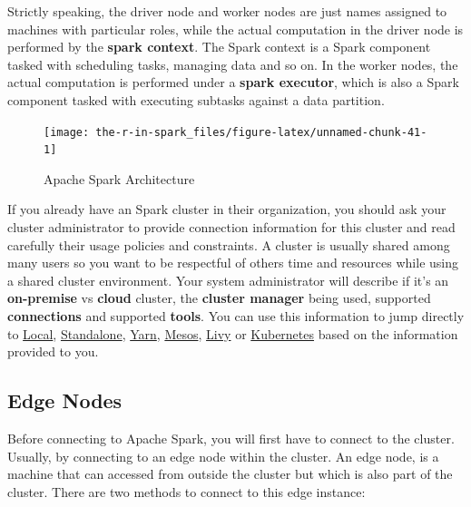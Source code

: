 \documentclass[]{book}
\theoremstyle{definition}
\theoremstyle{definition}
\theoremstyle{definition}
\theoremstyle{remark}
\begin{document}
Strictly speaking, the driver node and worker nodes are just names
assigned to machines with particular roles, while the actual computation
in the driver node is performed by the \textbf{spark context}. The Spark
context is a Spark component tasked with scheduling tasks, managing data
and so on. In the worker nodes, the actual computation is performed
under a \textbf{spark executor}, which is also a Spark component tasked
with executing subtasks against a data partition.

\begin{figure}

{\centering \texttt{[image: the-r-in-spark\_files/figure-latex/unnamed-chunk-41-1]} 

}

\caption{Apache Spark Architecture}\label{fig:unnamed-chunk-41}
\end{figure}

If you already have an Spark cluster in their organization, you should
ask your cluster administrator to provide connection information for
this cluster and read carefully their usage policies and constraints. A
cluster is usually shared among many users so you want to be respectful
of others time and resources while using a shared cluster environment.
Your system administrator will describe if it's an \textbf{on-premise}
vs \textbf{cloud} cluster, the \textbf{cluster manager} being used,
supported \textbf{connections} and supported \textbf{tools}. You can use
this information to jump directly to \protect\hyperlink{local}{Local},
\protect\hyperlink{standalone}{Standalone},
\protect\hyperlink{yarn-1}{Yarn}, \protect\hyperlink{mesos-1}{Mesos},
\protect\hyperlink{livy}{Livy} or
\protect\hyperlink{kubernetes-1}{Kubernetes} based on the information
provided to you.

\hypertarget{edge-nodes}{%
\subsection{Edge Nodes}\label{edge-nodes}}

Before connecting to Apache Spark, you will first have to connect to the
cluster. Usually, by connecting to an edge node within the cluster. An
edge node, is a machine that can accessed from outside the cluster but
which is also part of the cluster. There are two methods to connect to
this edge instance:
\end{document}

